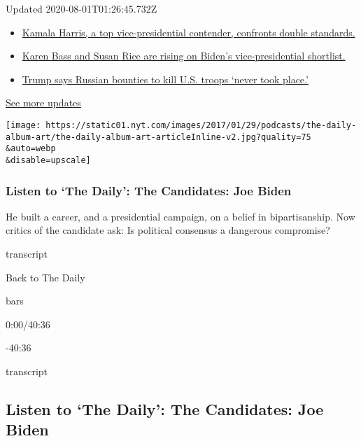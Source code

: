 Updated 2020-08-01T01:26:45.732Z

\begin{itemize}
\tightlist
\item
  \href{https://www.nytimes.com/2020/07/31/us/elections/biden-vs-trump.html?action=click\&pgtype=Article\&state=default\&region=MAIN_CONTENT_1\&context=storylines_live_updates\#link-29fdff45}{Kamala
  Harris, a top vice-presidential contender, confronts double
  standards.}
\item
  \href{https://www.nytimes.com/2020/07/31/us/elections/biden-vs-trump.html?action=click\&pgtype=Article\&state=default\&region=MAIN_CONTENT_1\&context=storylines_live_updates\#link-13ec3d9c}{Karen
  Bass and Susan Rice are rising on Biden's vice-presidential
  shortlist.}
\item
  \href{https://www.nytimes.com/2020/07/31/us/elections/biden-vs-trump.html?action=click\&pgtype=Article\&state=default\&region=MAIN_CONTENT_1\&context=storylines_live_updates\#link-49e9a016}{Trump
  says Russian bounties to kill U.S. troops `never took place.'}
\end{itemize}

\href{https://www.nytimes.com/2020/07/31/us/elections/biden-vs-trump.html?action=click\&pgtype=Article\&state=default\&region=MAIN_CONTENT_1\&context=storylines_live_updates}{See
more updates}

\texttt{[image: https://static01.nyt.com/images/2017/01/29/podcasts/the-daily-album-art/the-daily-album-art-articleInline-v2.jpg?quality=75\\\&auto=webp\\\&disable=upscale]}

\hypertarget{listen-to-the-daily-the-candidates-joe-biden}{%
\subsubsection{Listen to `The Daily': The Candidates: Joe
Biden}\label{listen-to-the-daily-the-candidates-joe-biden}}

He built a career, and a presidential campaign, on a belief in
bipartisanship. Now critics of the candidate ask: Is political consensus
a dangerous compromise?

transcript

Back to The Daily

bars

0:00/40:36

-40:36

transcript

\hypertarget{listen-to-the-daily-the-candidates-joe-biden-1}{%
\subsection{Listen to `The Daily': The Candidates: Joe
Biden}\label{listen-to-the-daily-the-candidates-joe-biden-1}}

